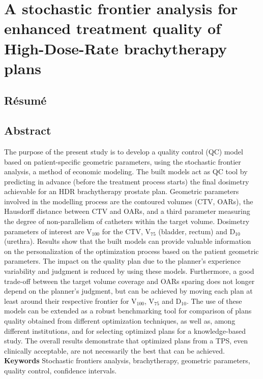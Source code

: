 \chapter{A stochastic frontier analysis for enhanced treatment quality of High-Dose-Rate brachytherapy plans} %
%
\section{Résumé} 
%
\section{Abstract} 
\noindent The purpose of the present study is to develop a quality control (QC) model based on patient-specific geometric parameters, using the stochastic frontier analysis, a method of economic modeling. The built models act as QC tool by predicting in advance (before the treatment process starts) the final dosimetry achievable for an HDR brachytherapy prostate plan. Geometric parameters involved in the modelling process are the contoured volumes (CTV, OARs), the Hausdorff distance between CTV and OARs, and a third parameter measuring the degree of non-parallelism of catheters within the target volume. Dosimetry parameters of interest are V$_{100}$ for the CTV, V$_{75}$ (bladder, rectum) and D$_{10}$ (urethra). Results show that the built models can provide valuable information on the personalization of the optimization process based on the patient geometric parameters. The impact on the quality plan due to the planner's experience variability and judgment is reduced by using these models. Furthermore, a good trade-off between the target volume coverage and OARs sparing does not longer depend on the planner's judgment, but can be achieved by moving each plan at least around their respective frontier for V$_{100}$, V$_{75}$ and D$_{10}$. The use of these models can be extended as a robust benchmarking tool for comparison of plans quality obtained from different optimization techniques, as well as, among different institutions, and for selecting optimized plans for a knowledge-based study. The overall results demonstrate that optimized plans from a TPS, even clinically acceptable, are not necessarily the best that can be achieved.\newline
\newline
\textbf{Keywords} Stochastic frontiers analysis, brachytherapy, geometric parameters, quality control, confidence intervals.\newline
%
